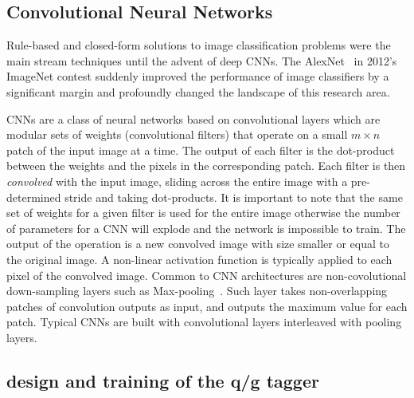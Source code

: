 \subsection{Convolutional Neural Networks}
\label{sec:cnn-cnn}

Rule-based and closed-form solutions to image classification problems were the main stream techniques until the advent of deep CNNs. The AlexNet~\cite{AlexNet} in 2012's ImageNet contest suddenly improved the performance of image classifiers by a significant margin and profoundly changed the landscape of this research area.

CNNs are a class of neural networks based on convolutional layers which are modular sets of weights (convolutional filters) that operate on a small $m\times n$ patch of the input image at a time. The output of each filter is the dot-product between the weights and the pixels in the corresponding patch. Each filter is then \emph{convolved} with the input image, sliding across the entire image with a pre-determined stride and taking dot-products. It is important to note that the same set of weights for a given filter is used for the entire image otherwise the number of parameters for a CNN will explode and the network is impossible to train. The output of the operation is a new convolved image with size smaller or equal to the original image. A non-linear activation function is typically applied to each pixel of the convolved image.
Common to CNN architectures are non-covolutional down-sampling layers such as Max-pooling~\cite{MAXPOOL}.
Such layer takes non-overlapping patches of convolution outputs as input, and outputs the maximum value for each patch.
Typical CNNs are built with convolutional layers interleaved with pooling layers. 



\subsection{design and training of the q/g tagger}

